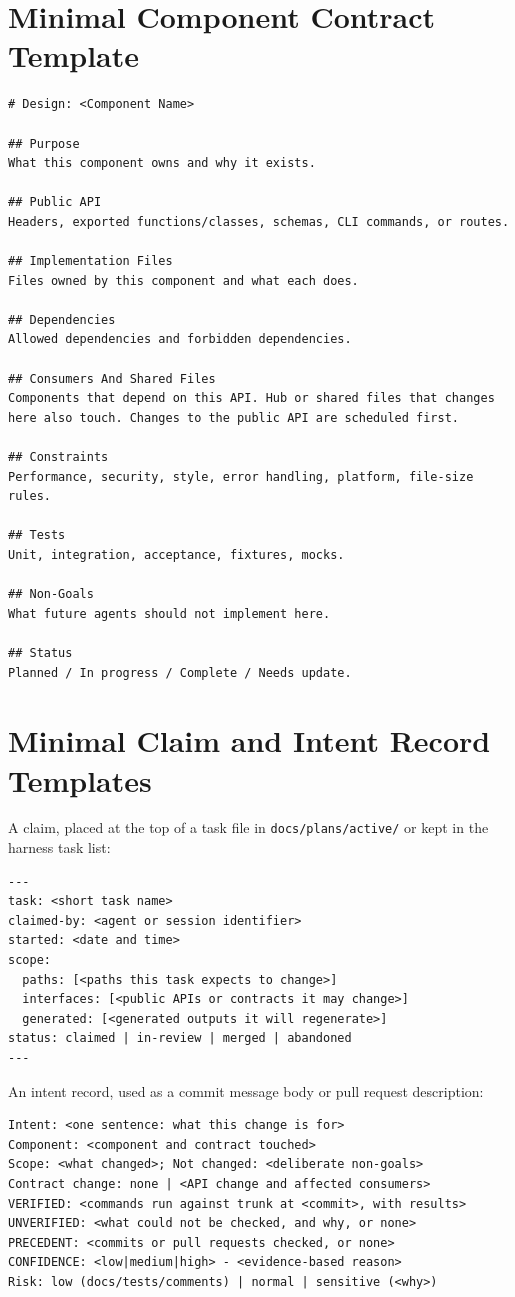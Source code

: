 \documentclass[11pt]{article}
\begin{document}
\section{Minimal Component Contract Template}
\begin{verbatim}
# Design: <Component Name>

## Purpose
What this component owns and why it exists.

## Public API
Headers, exported functions/classes, schemas, CLI commands, or routes.

## Implementation Files
Files owned by this component and what each does.

## Dependencies
Allowed dependencies and forbidden dependencies.

## Consumers And Shared Files
Components that depend on this API. Hub or shared files that changes
here also touch. Changes to the public API are scheduled first.

## Constraints
Performance, security, style, error handling, platform, file-size rules.

## Tests
Unit, integration, acceptance, fixtures, mocks.

## Non-Goals
What future agents should not implement here.

## Status
Planned / In progress / Complete / Needs update.
\end{verbatim}

\section{Minimal Claim and Intent Record Templates}
A claim, placed at the top of a task file in \texttt{docs/plans/active/} or kept in the harness task list:

\begin{verbatim}
---
task: <short task name>
claimed-by: <agent or session identifier>
started: <date and time>
scope:
  paths: [<paths this task expects to change>]
  interfaces: [<public APIs or contracts it may change>]
  generated: [<generated outputs it will regenerate>]
status: claimed | in-review | merged | abandoned
---
\end{verbatim}

An intent record, used as a commit message body or pull request description:

\begin{verbatim}
Intent: <one sentence: what this change is for>
Component: <component and contract touched>
Scope: <what changed>; Not changed: <deliberate non-goals>
Contract change: none | <API change and affected consumers>
VERIFIED: <commands run against trunk at <commit>, with results>
UNVERIFIED: <what could not be checked, and why, or none>
PRECEDENT: <commits or pull requests checked, or none>
CONFIDENCE: <low|medium|high> - <evidence-based reason>
Risk: low (docs/tests/comments) | normal | sensitive (<why>)
\end{verbatim}
\end{document}
